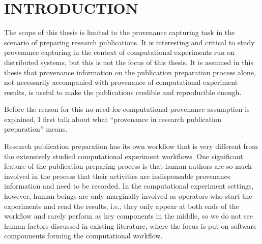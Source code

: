  
\chapter{INTRODUCTION}
The scope of this thesis is limited to the provenance capturing task in the scenario of preparing research publications. It is interesting and critical to study provenance capturing in the context of computational experiments run on distributed systems, but this is not the focus of this thesis. It is assumed in this thesis that provenance information on the publication preparation process alone, not necessarily accompanied with provenance of computational experiment results, is useful to make the publications credible and reproducible enough.

Before the reason for this no-need-for-computational-provenance assumption is explained, I first talk about what ``provenance in research publication preparation'' means. 

Research publication preparation has its own workflow that is very different from the extensively studied computational experiment workflows. One significant feature of the publication preparing process is that human authors are so much involved in the process that their activities are indispensable provenance information and need to be recorded. In the computational experiment settings, however, human beings are only marginally involved as operators who start the experiments and read the results, i.e., they only appear at both ends of the workflow and rarely perform as key components in the middle, so we do not see human factors discussed in existing literature, where the focus is put on software componnents forming the computational workflow.

